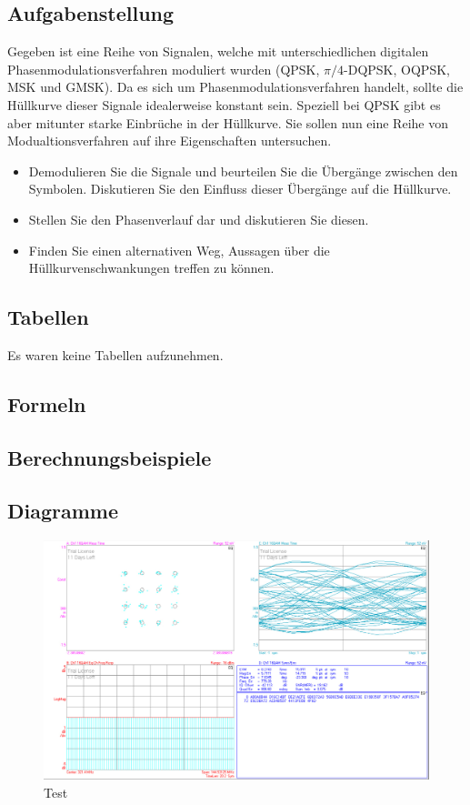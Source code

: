 \documentclass[12pt,a4paper,ngerman]{article}
\begin{document}
\subsection{Aufgabenstellung}
Gegeben ist eine Reihe von Signalen, welche mit unterschiedlichen digitalen Phasenmodulationsverfahren moduliert wurden (QPSK, $\pi/4$-DQPSK, OQPSK, MSK und GMSK). Da es sich um Phasenmodulationsverfahren handelt, sollte die Hüllkurve dieser Signale idealerweise konstant sein. Speziell bei QPSK gibt es aber mitunter starke Einbrüche in der Hüllkurve. Sie sollen nun eine Reihe von Modualtionsverfahren auf ihre Eigenschaften untersuchen. 
\begin{itemize}
\item Demodulieren Sie die Signale und beurteilen Sie die Übergänge zwischen den Symbolen. Diskutieren Sie den Einfluss dieser Übergänge auf die Hüllkurve. 
\item Stellen Sie den Phasenverlauf dar und diskutieren Sie diesen.
\item Finden Sie einen alternativen Weg, Aussagen über die Hüllkurvenschwankungen treffen zu können.
\end{itemize}


\subsection{Tabellen}
Es waren keine Tabellen aufzunehmen. 
\subsection{Formeln}

\subsection{Berechnungsbeispiele}

\subsection{Diagramme}
\begin{figure}[H]
\centering
\includegraphics[width=\textwidth]{figures/Aufgabe3_16QAM_demod.jpg} 
\caption{Test}
\end{figure}
\end{document}
